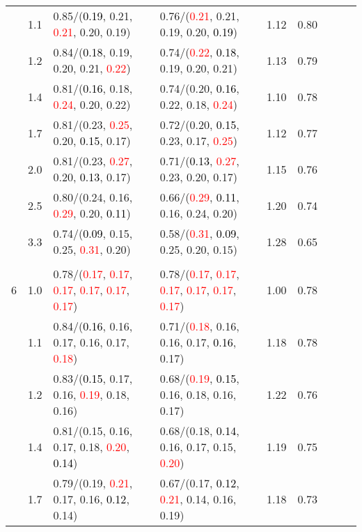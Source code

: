 \documentclass[10pt,a4paper]{report}
\begin{document}
\begin{table}[!htbp]
\begin{center}
{\begin{tabular}{ccllccccc}
			&1.1&0.85/(\textcolor{black}{0.19}, 0.21, \textcolor{red}{0.21}, 0.20, 0.19)&0.76/(\textcolor{red}{0.21}, 0.21, 0.19, 0.20, \textcolor{black}{0.19})&1.12&0.80\\
			&1.2&0.84/(\textcolor{black}{0.18}, 0.19, 0.20, 0.21, \textcolor{red}{0.22})&0.74/(\textcolor{red}{0.22}, \textcolor{black}{0.18}, 0.19, 0.20, 0.21)&1.13&0.79\\
			&1.4&0.81/(\textcolor{black}{0.16}, 0.18, \textcolor{red}{0.24}, 0.20, 0.22)&0.74/(0.20, \textcolor{black}{0.16}, 0.22, 0.18, \textcolor{red}{0.24})&1.10&0.78\\
			&1.7&0.81/(0.23, \textcolor{red}{0.25}, 0.20, \textcolor{black}{0.15}, 0.17)&0.72/(0.20, \textcolor{black}{0.15}, 0.23, 0.17, \textcolor{red}{0.25})&1.12&0.77\\
			&2.0&0.81/(0.23, \textcolor{red}{0.27}, 0.20, \textcolor{black}{0.13}, 0.17)&0.71/(\textcolor{black}{0.13}, \textcolor{red}{0.27}, 0.23, 0.20, 0.17)&1.15&0.76\\
			&2.5&0.80/(0.24, 0.16, \textcolor{red}{0.29}, 0.20, \textcolor{black}{0.11})&0.66/(\textcolor{red}{0.29}, \textcolor{black}{0.11}, 0.16, 0.24, 0.20)&1.20&0.74\\
			&3.3&0.74/(\textcolor{black}{0.09}, 0.15, 0.25, \textcolor{red}{0.31}, 0.20)&0.58/(\textcolor{red}{0.31}, \textcolor{black}{0.09}, 0.25, 0.20, 0.15)&1.28&0.65\\
			&&&&\\
			6			&1.0&0.78/(\textcolor{red}{0.17}, \textcolor{red}{0.17}, \textcolor{red}{0.17}, \textcolor{red}{0.17}, \textcolor{red}{0.17}, \textcolor{red}{0.17})&0.78/(\textcolor{red}{0.17}, \textcolor{red}{0.17}, \textcolor{red}{0.17}, \textcolor{red}{0.17}, \textcolor{red}{0.17}, \textcolor{red}{0.17})&1.00&0.78\\
			&1.1&0.84/(\textcolor{black}{0.16}, 0.16, 0.17, 0.16, 0.17, \textcolor{red}{0.18})&0.71/(\textcolor{red}{0.18}, 0.16, 0.16, 0.17, \textcolor{black}{0.16}, 0.17)&1.18&0.78\\
			&1.2&0.83/(\textcolor{black}{0.15}, 0.17, 0.16, \textcolor{red}{0.19}, 0.18, 0.16)&0.68/(\textcolor{red}{0.19}, \textcolor{black}{0.15}, 0.16, 0.18, 0.16, 0.17)&1.22&0.76\\
			&1.4&0.81/(0.15, 0.16, 0.17, 0.18, \textcolor{red}{0.20}, \textcolor{black}{0.14})&0.68/(0.18, \textcolor{black}{0.14}, 0.16, 0.17, 0.15, \textcolor{red}{0.20})&1.19&0.75\\
			&1.7&0.79/(0.19, \textcolor{red}{0.21}, 0.17, 0.16, \textcolor{black}{0.12}, 0.14)&0.67/(0.17, \textcolor{black}{0.12}, \textcolor{red}{0.21}, 0.14, 0.16, 0.19)&1.18&0.73\\

\end{tabular}}
\end{center}
\end{table}
\end{document}
